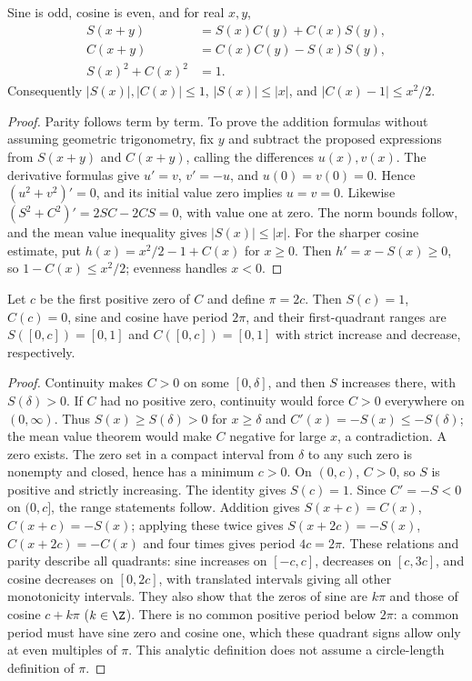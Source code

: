 \begin{theorem}
Sine is odd, cosine is even, and for real $x,y$,
\begin{align*}
S(x+y)&=S(x)C(y)+C(x)S(y),\\
C(x+y)&=C(x)C(y)-S(x)S(y),\\
S(x)^2+C(x)^2&=1.
\end{align*}
Consequently $|S(x)|,|C(x)|\le1$, $|S(x)|\le|x|$, and
$|C(x)-1|\le x^2/2$.
\end{theorem}
\begin{proof}
Parity follows term by term. To prove the addition formulas without assuming
geometric trigonometry, fix $y$ and subtract the proposed expressions from
$S(x+y)$ and $C(x+y)$, calling the differences $u(x),v(x)$.
The derivative formulas give $u'=v$, $v'=-u$, and $u(0)=v(0)=0$.
Hence $(u^2+v^2)'=0$, and its initial value zero implies $u=v=0$.
Likewise $(S^2+C^2)'=2SC-2CS=0$, with value one at zero.
The norm bounds follow, and the mean value inequality gives $|S(x)|\le|x|$.
For the sharper cosine estimate, put $h(x)=x^2/2-1+C(x)$ for $x\ge0$.
Then $h'=x-S(x)\ge0$, so $1-C(x)\le x^2/2$; evenness handles $x<0$.
\end{proof}

\begin{construction}
Let $c$ be the first positive zero of $C$ and define $\pi=2c$.
Then $S(c)=1$, $C(c)=0$, sine and cosine have period $2\pi$,
and their first-quadrant ranges are $S([0,c])=[0,1]$ and
$C([0,c])=[0,1]$ with strict increase and decrease, respectively.
\end{construction}
\begin{proof}
Continuity makes $C>0$ on some $[0,\delta]$, and then $S$ increases there,
with $S(\delta)>0$. If $C$ had no positive zero, continuity would force
$C>0$ everywhere on $(0,\infty)$. Thus $S(x)\ge S(\delta)>0$ for
$x\ge\delta$ and $C'(x)=-S(x)\le-S(\delta)$; the mean value theorem
would make $C$ negative for large $x$, a contradiction. A zero exists.
The zero set in a compact interval from $\delta$ to any such zero is
nonempty and closed, hence has a minimum $c>0$. On $(0,c)$, $C>0$,
so $S$ is positive and strictly increasing. The identity gives $S(c)=1$.
Since $C'=-S<0$ on $(0,c]$, the range statements follow.
Addition gives $S(x+c)=C(x)$, $C(x+c)=-S(x)$; applying these twice gives
$S(x+2c)=-S(x)$, $C(x+2c)=-C(x)$ and four times gives period $4c=2\pi$.
These relations and parity describe all quadrants: sine increases on
$[-c,c]$, decreases on $[c,3c]$, and cosine decreases on $[0,2c]$,
with translated intervals giving all other monotonicity intervals.
They also show that the zeros of sine are $k\pi$ and those of cosine
$c+k\pi$ ($k\in\Z$). There is no common positive period below $2\pi$:
a common period must have sine zero and cosine one, which these quadrant
signs allow only at even multiples of $\pi$.
This analytic definition does not assume a circle-length definition of $\pi$.
\end{proof}

